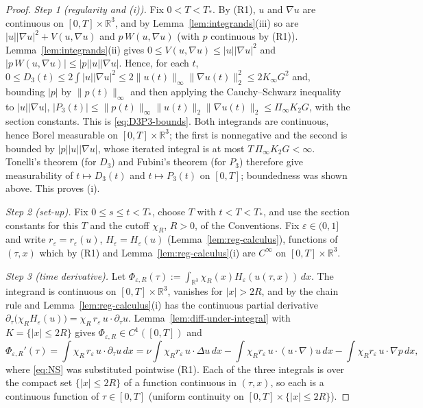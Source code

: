 \documentclass[11pt]{article}
\theoremstyle{definition}
\theoremstyle{plain}
\newcommand{\R}{\mathbb R}
\newcommand{\norm}[1]{\lVert #1\rVert}
\begin{document}
\begin{proof}
\emph{Step 1 (regularity and (i)).}  Fix $0<T<T_*$.  By (R1), $u$ and
$\nabla u$ are continuous on $[0,T]\times\R^3$, and by
Lemma~\ref{lem:integrands}(iii) so are $|u||\nabla u|^2+V(u,\nabla u)$ and
$p\,W(u,\nabla u)$ (with $p$ continuous by (R1)).
Lemma~\ref{lem:integrands}(ii)
gives $0\leq V(u,\nabla u)\leq|u||\nabla u|^2$ and
$|p\,W(u,\nabla u)|\leq|p||u||\nabla u|$.  Hence, for each $t$,
$0\leq D_3(t)\leq2\int|u||\nabla u|^2\leq2\norm{u(t)}_\infty\norm{\nabla u(t)}_2^2\leq2K_\infty G^2$
and, bounding $|p|$ by $\norm{p(t)}_\infty$ and then applying the
Cauchy--Schwarz inequality to $|u||\nabla u|$,
$|P_3(t)|\leq\norm{p(t)}_\infty\norm{u(t)}_2\norm{\nabla u(t)}_2\leq\Pi_\infty K_2G$,
with the section constants.  This is \eqref{eq:D3P3-bounds}.  Both
integrands are continuous, hence Borel measurable on $[0,T]\times\R^3$; the
first is nonnegative and the second is bounded by $|p||u||\nabla u|$, whose
iterated integral is at most $T\,\Pi_\infty K_2G<\infty$.  Tonelli's theorem
(for $D_3$) and Fubini's theorem (for $P_3$) \cite[Ch.~8]{Rudin1987}
therefore give measurability of $t\mapsto D_3(t)$ and $t\mapsto P_3(t)$ on
$[0,T]$; boundedness was shown above.  This proves (i).

\emph{Step 2 (set-up).}  Fix $0\leq s\leq t<T_*$, choose $T$ with
$t<T<T_*$, and use the section constants for this $T$ and the cutoff
$\chi_R$, $R>0$, of the Conventions.  Fix $\varepsilon\in(0,1]$ and write
$r_\varepsilon=r_\varepsilon(u)$, $H_\varepsilon=H_\varepsilon(u)$
(Lemma~\ref{lem:reg-calculus}), functions of $(\tau,x)$ which by (R1) and
Lemma~\ref{lem:reg-calculus}(i) are $C^\infty$ on $[0,T]\times\R^3$.

\emph{Step 3 (time derivative).}  Let
$\Phi_{\varepsilon,R}(\tau):=\int_{\R^3}\chi_R(x)H_\varepsilon(u(\tau,x))\,dx$.
The integrand is continuous on $[0,T]\times\R^3$, vanishes for $|x|>2R$,
and by the chain rule and Lemma~\ref{lem:reg-calculus}(i) has the continuous
partial derivative
$\partial_\tau\bigl(\chi_RH_\varepsilon(u)\bigr)=\chi_R\,r_\varepsilon\,u\cdot\partial_\tau u$.
Lemma~\ref{lem:diff-under-integral} with $K=\{|x|\leq2R\}$ gives
$\Phi_{\varepsilon,R}\in C^1([0,T])$ and
\[
 \Phi_{\varepsilon,R}'(\tau)
 =\int\chi_R\,r_\varepsilon\,u\cdot\partial_\tau u\,dx
 =\nu\int\chi_Rr_\varepsilon\,u\cdot\Delta u\,dx
  -\int\chi_Rr_\varepsilon\,u\cdot(u\cdot\nabla)u\,dx
  -\int\chi_Rr_\varepsilon\,u\cdot\nabla p\,dx,
\]
where \eqref{eq:NS} was substituted pointwise (R1).  Each of the three
integrals is over the compact set $\{|x|\leq2R\}$ of a function continuous
in $(\tau,x)$, so each is a continuous function of $\tau\in[0,T]$ (uniform
continuity on $[0,T]\times\{|x|\leq2R\}$).


\end{proof}
\end{document}
